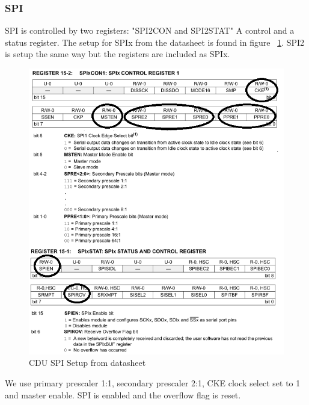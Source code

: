 \subsubsection{SPI}
SPI is controlled by two registers: "SPI2CON and SPI2STAT" A control and a status register. The setup for SPIx from the datasheet is found in figure ~\ref{fig:spisetup}. SPI2 is setup the same way but the registers are included as SPIx.\\
\begin{figure}[H]
\centering
\includegraphics[width=1\textwidth]{billeder/spisetup}
\caption{CDU SPI Setup from datasheet}
\label{fig:spisetup}
\end{figure}
We use primary prescaler 1:1, secondary prescaler 2:1, CKE clock select set to 1 and master enable. SPI is enabled and the overflow flag is reset.
